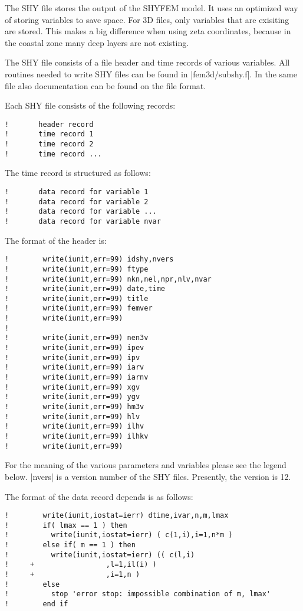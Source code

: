 The SHY file stores the output of the SHYFEM model. It uses an optimized
way of storing variables to save space.  For 3D files, only variables
that are exisiting are stored. This makes a big difference when using
zeta coordinates, because in the coastal zone many deep layers are
not existing.

The SHY file consists of a file header and time records of various
variables.
All routines needed to write SHY files can be found in |fem3d/subshy.f|.
In the same file also documentation can be found on the file format.

Each SHY file consists of the following records:

\begin{verbatim}
!       header record
!       time record 1
!       time record 2
!       time record ...
\end{verbatim}

The time record is structured as follows:

\begin{verbatim}
!       data record for variable 1
!       data record for variable 2
!       data record for variable ...
!       data record for variable nvar
\end{verbatim}

The format of the header is:

\begin{verbatim}
!        write(iunit,err=99) idshy,nvers
!        write(iunit,err=99) ftype
!        write(iunit,err=99) nkn,nel,npr,nlv,nvar
!        write(iunit,err=99) date,time
!        write(iunit,err=99) title
!        write(iunit,err=99) femver
!        write(iunit,err=99) 
!
!        write(iunit,err=99) nen3v
!        write(iunit,err=99) ipev
!        write(iunit,err=99) ipv
!        write(iunit,err=99) iarv
!        write(iunit,err=99) iarnv
!        write(iunit,err=99) xgv
!        write(iunit,err=99) ygv
!        write(iunit,err=99) hm3v
!        write(iunit,err=99) hlv
!        write(iunit,err=99) ilhv
!        write(iunit,err=99) ilhkv
!        write(iunit,err=99) 
\end{verbatim}

For the meaning of the various parameters and variables please
see the legend below. |nvers| is a version number of the SHY files. Presently,
the version is 12.

The format of the data record depends is as follows:

\begin{verbatim}
!        write(iunit,iostat=ierr) dtime,ivar,n,m,lmax
!        if( lmax == 1 ) then
!          write(iunit,iostat=ierr) ( c(1,i),i=1,n*m )
!        else if( m == 1 ) then
!          write(iunit,iostat=ierr) (( c(l,i)
!     +                 ,l=1,il(i) )
!     +                 ,i=1,n )
!        else
!          stop 'error stop: impossible combination of m, lmax'
!        end if
\end{verbatim}


